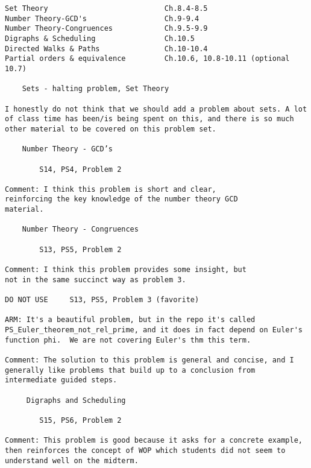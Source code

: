 \documentclass[handout]{mcs}
\begin{document}
\renewcommand{\reading}{
\begin{itemize}
\item Chapter~\bref{number_theory_chap}.\ \emph{Number Theory} through
Section~\bref{sec:inverse}.
\item Chapter~\bref{digraphs_chap}.\ \emph{Digraphs}, (Section~\bref{poset-as-sets_sec} optional).
\end{itemize}}


\begin{staffnotes}
\begin{verbatim}
Set Theory                           Ch.8.4-8.5
Number Theory-GCD's                  Ch.9-9.4
Number Theory-Congruences            Ch.9.5-9.9
Digraphs & Scheduling                Ch.10.5
Directed Walks & Paths               Ch.10-10.4
Partial orders & equivalence         Ch.10.6, 10.8-10.11 (optional 10.7)

    Sets - halting problem, Set Theory

I honestly do not think that we should add a problem about sets. A lot
of class time has been/is being spent on this, and there is so much
other material to be covered on this problem set.

    Number Theory - GCD’s

        S14, PS4, Problem 2

Comment: I think this problem is short and clear,
reinforcing the key knowledge of the number theory GCD
material.

    Number Theory - Congruences

        S13, PS5, Problem 2

Comment: I think this problem provides some insight, but
not in the same succinct way as problem 3.

DO NOT USE     S13, PS5, Problem 3 (favorite)

ARM: It's a beautiful problem, but in the repo it's called
PS_Euler_theorem_not_rel_prime, and it does in fact depend on Euler's
function phi.  We are not covering Euler's thm this term.

Comment: The solution to this problem is general and concise, and I
generally like problems that build up to a conclusion from
intermediate guided steps.

     Digraphs and Scheduling

        S15, PS6, Problem 2

Comment: This problem is good because it asks for a concrete example,
then reinforces the concept of WOP which students did not seem to
understand well on the midterm.


\end{verbatim}
\end{staffnotes}
\end{document}
